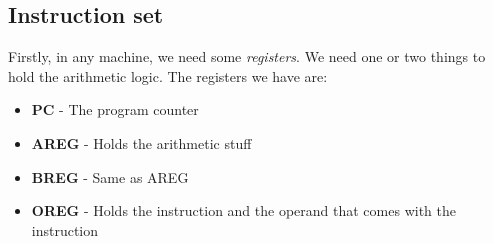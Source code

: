 \documentclass[11pt,a4paper,titlepage,dvipsnames,cmyk]{scrartcl}
\begin{document}
\subsection{Instruction set}%
\label{sub:Instruction set}
Firstly, in any machine, we need some \textit{registers}. We need one or
two things to hold the arithmetic logic. The registers we have are:
\begin{itemize}
    \item \textbf{PC} - The program counter
    \item \textbf{AREG} - Holds the arithmetic stuff
    \item \textbf{BREG} - Same as AREG
    \item \textbf{OREG} - Holds the instruction and the operand that comes
        with the instruction
\end{itemize}
\end{document}
